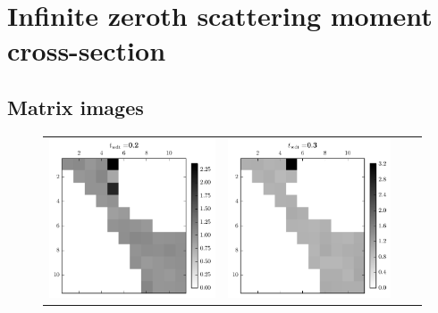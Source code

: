 \section{Infinite zeroth scattering moment cross-section}
\label{sec:homog_inf_sp0_data}

\subsection{Matrix images}
\label{sec:homog_inf_sp0_mat}

\begin{figure}[h]
  \centering
  \begin{tabular}{cccc}
    \includegraphics[scale=0.75]{images/results/matshows/homog_sp0_matshow_1}
    &
    \includegraphics[scale=0.75]{images/results/matshows/homog_sp0_matshow_2}

\end{tabular}
\end{figure}
